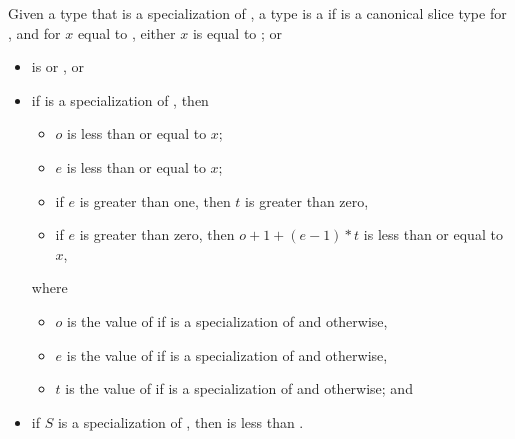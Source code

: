 \pnum
Given a type  that is a specialization of ,
a type  is a
if  is a canonical slice type for , and
for $x$ equal to ,
either $x$ is equal to ; or
\begin{itemize}
\item
   is  or , or
\item
  if  is a specialization of , then
  \begin{itemize}
  \item
    $o$ is less than or equal to $x$;
  \item
    $e$ is less than or equal to $x$;
  \item
    if $e$ is greater than one,
    then $t$ is greater than zero,
  \item
    if $e$ is greater than zero,
    then $o + 1 + (e - 1) * t$ is less than or equal to $x$,
  \end{itemize}
  where
  \begin{itemize}
  \item
    $o$ is the value of 
    if  is a specialization of  and
     otherwise,
  \item
    $e$ is the value of 
    if  is a specialization of  and
     otherwise,
  \item
    $t$ is the value of 
    if  is a specialization of  and
     otherwise; and
  \end{itemize}
\item
  if $S$ is a specialization of ,
  then  is less than .
\end{itemize}

